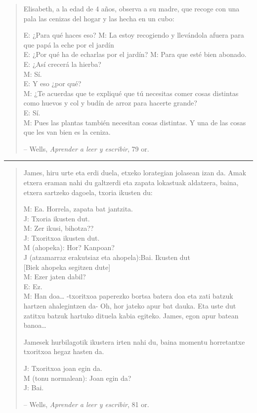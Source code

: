 \documentclass[
]{book}
\begin{document}
\begin{quote}
Elisabeth, a la edad de 4 años, observa a su madre, que recoge con una pala las cenizas del hogar y las hecha en un cubo:

E: ¿Para qué haces eso? M: La estoy recogiendo y llevándola afuera para que papá la eche por el jardín\\
E: ¿Por qué ha de echarlas por el jardín? M: Para que esté bien abonado.\\
E: ¿Así crecerá la hierba?\\
M: Sí.\\
E: Y eso ¿por qué?\\
M: ¿Te acuerdas que te expliqué que tú necesitas comer cosas distintas como huevos y col y budín de arroz para hacerte grande?\\
E: Sí.\\
M: Pues las plantas también necesitan cosas distintas. Y una de las cosas que les van bien es la ceniza.

-- Wells, \emph{Aprender a leer y escribir}, 79 or.
\end{quote}

\begin{center}\rule{0.5\linewidth}{0.5pt}\end{center}

\begin{quote}
James, hiru urte eta erdi duela, etxeko lorategian jolasean izan da. Amak etxera eraman nahi du galtzerdi eta zapata lokastuak aldatzera, baina, etxera sartzeko dagoela, txoria ikusten du:

M: Ea. Horrela, zapata bat jantzita.\\
J: Txoria ikusten dut.\\
M: Zer ikusi, bihotza??\\
J: Txoritxoa ikusten dut.\\
M (ahopeka): Hor? Kanpoan?\\
J (atzamarraz erakutsiaz eta ahopela):Bai. Ikusten dut\\
{[}Biek ahopeka segitzen dute{]}\\
M: Ezer jaten dabil?\\
E: Ez.\\
M: Han doa\ldots{} -txoritxoa paperezko bortsa batera doa eta zati batzuk hartzen ahalegintzen da- Oh, hor jateko apur bat dauka. Eta uste dut zatitxu batzuk hartuko dituela kabia egiteko. James, egon apur batean banoa\ldots{}

Jamesek hurbilagotik ikustera irten nahi du, baina momentu horretantxe txoritxoa hegaz hasten da.

J: Txoritxoa joan egin da.\\
M (tonu normalean): Joan egin da?\\
J: Bai.

-- Wells, \emph{Aprender a leer y escribir}, 81 or.
\end{quote}
\end{document}
